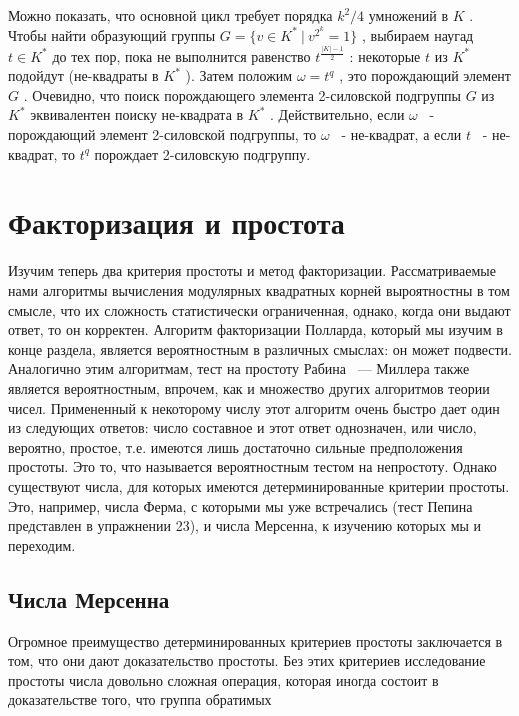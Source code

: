 Можно показать, что основной цикл требует порядка $k^2/4$
 умножений в $K$
 . Чтобы найти образующий группы $G=\{v\in K^* \ | \ v^{2^k}=1\}$
, выбираем наугад $t\in K^*$
 до тех пор, пока не выполнится равенство $t^{\frac{|K|-1}{2}}$
 : некоторые $t$
 из $K^*$
 подойдут (не-квадраты в $K^*$
    ). Затем положим $\omega = t^q$
 , это порождающий элемент $G$
. Очевидно, что поиск порождающего элемента 2-силовской подгруппы $G$
 из $K^*$
 эквивалентен поиску не-квадрата в $K^*$
 . Действительно, если $\omega$
 ~- порождающий элемент 2-силовской подгруппы, то $\omega$
 ~- не-квадрат, а если $t$
 ~- не-квадрат, то $t^q$
 порождает 2-силовскую подгруппу.

\section{Факторизация и простота}

Изучим теперь два критерия простоты и метод факторизации. Рассматриваемые нами алгоритмы вычисления модулярных квадратных 
корней выроятностны в том смысле, что их сложность статистически 
ограниченная, однако, когда они выдают ответ, то он корректен.  
Алгоритм факторизации Полларда, который мы изучим в конце раздела, 
является вероятностным в различных смыслах: он может подвести. 
Аналогично этим алгоритмам, тест на простоту Рабина ~—  
Миллера также является вероятностным, впрочем, как и множество других 
алгоритмов теории чисел. Примененный к некоторому числу этот  
алгоритм очень быстро дает один из следующих ответов: число составное 
и этот ответ однозначен, или число, вероятно, простое, т.е. имеются 
лишь достаточно сильные предположения простоты. Это то, что  
называется вероятностным тестом на непростоту. Однако существуют 
числа, для которых имеются детерминированные критерии простоты. 
Это, например, числа Ферма, с которыми мы уже встречались (тест 
Пепина представлен в упражнении 23), и числа Мерсенна, к изучению 
которых мы и переходим. 

\subsection{Числа Мерсенна} 

Огромное преимущество детерминированных критериев простоты  
заключается в том, что они дают доказательство простоты. Без этих 
критериев исследование простоты числа довольно сложная операция, 
которая иногда состоит в доказательстве того, что группа обратимых 

\newpage

